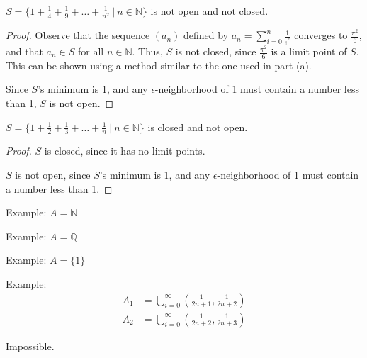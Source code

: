 \documentclass[12pt]{article}
\begin{document}
\medskip
{} $S = \{1 + \frac14 + \frac19 + \hdots + \frac1{n^2}~|~n\in \mathbb N\}$ is not open and not closed.
\begin{proof}
    Observe that the sequence $(a_n)$ defined by $a_n = \sum\limits_{i=0}^n\frac1{i^2}$ converges to $\frac{\pi^2}6$, and that $a_n \in S$ for all $n \in \mathbb N$. Thus, $S$ is not closed, since $\frac{\pi^2}6$ is a limit point of $S$. This can be shown using a method similar to the one used in part (a).

    Since $S$'s minimum is 1, and any $\epsilon$-neighborhood of 1 must contain a number less than 1, $S$ is not open.
\end{proof}

\medskip
{} $S = \{1 + \frac12 + \frac13 + \hdots + \frac1{n}~|~n\in \mathbb N\}$ is closed and not open.
\begin{proof}
    $S$ is closed, since it has no limit points.

    $S$ is not open, since $S$'s minimum is 1, and any $\epsilon$-neighborhood of 1 must contain a number less than 1.
\end{proof}

\newpage
{}

\medskip
{} Example: $A = \mathbb N$

    

\medskip
{} Example: $A = \mathbb Q$

    

\medskip
{} Example: $A = \{1\}$



\medskip
{} Example:
\begin{align*}
    A_1 &= \bigcup_{i=0}^\infty \left(\frac1{2n+1}, \frac1{2n+2}\right) \\
    A_2 &= \bigcup_{i=0}^\infty \left(\frac1{2n+2}, \frac1{2n+3}\right)
\end{align*}


\medskip
{} Impossible.
\end{document}
